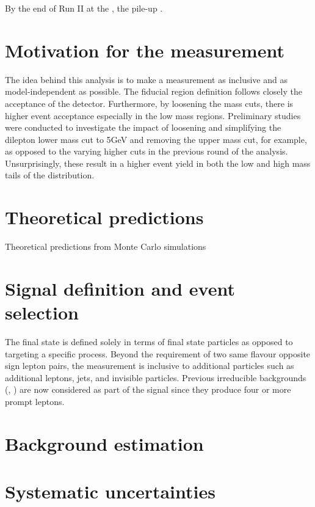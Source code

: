 By the end of Run II at the \LHC, the pile-up .
\section{Motivation for the \mFourL measurement}
\label{sec:fourlepmotivation}

The idea behind this analysis is to make a measurement as inclusive and as model-independent as possible. The fiducial region definition follows closely the acceptance of the detector. Furthermore, by loosening the mass cuts, there is higher event acceptance especially in the low mass regions. Preliminary studies were conducted to investigate the impact of loosening and simplifying the dilepton lower mass cut to \unit{5}{GeV} and removing the upper mass cut, for example, as opposed to the varying higher cuts in the previous round of the analysis. Unsurprisingly, these result in a higher event yield in both the low and high mass tails of the \mFourL distribution. 

\section{Theoretical predictions}
\label{sec:theory}

Theoretical predictions from Monte Carlo simulations

\section{Signal definition and event selection}
\label{sec:signaldef}

The final state is defined solely in terms of final state particles as opposed to targeting a specific process. Beyond the requirement of two same flavour opposite sign lepton pairs, the measurement is inclusive to additional particles such as additional leptons, jets, and invisible particles. Previous irreducible backgrounds (\VVV, \ttZ) are now considered as part of the signal since they produce four or more prompt leptons.

\section{Background estimation}
\label{sec:background}

\section{Systematic uncertainties}
\label{sec:sysuncert}

